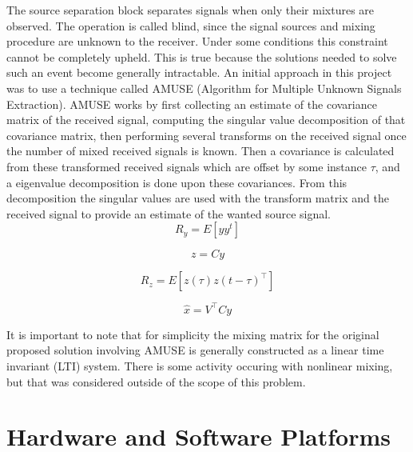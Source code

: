 The source separation block separates signals when only their mixtures are observed.  The operation is called blind, since the signal sources and mixing procedure are unknown to the receiver.  Under some conditions this constraint cannot be completely upheld.  This is true because the solutions needed to solve such an event become generally intractable.  An initial approach in this project was to use a technique called AMUSE (Algorithm for Multiple Unknown Signals Extraction)\cite{AMUSE}.  AMUSE works by first collecting an estimate of the covariance matrix of the received signal, computing the singular value decomposition of that covariance matrix, then performing several transforms on the received signal once the number of mixed received signals is known.  Then a covariance is calculated from these transformed received signals which are offset by some instance \(\tau\), and a eigenvalue decomposition is done upon these covariances.  From this decomposition the singular values are used with the transform matrix and the received signal to provide an estimate of the wanted source signal.\\

\begin{equation}\label{}
R_{y}=E[yy^{t}]
\end{equation}

\begin{equation}\label{}
z=Cy
\end{equation}

\begin{equation}\label{}
R_{z}=E[z(\tau)z(t-\tau)^\top]
\end{equation}

\begin{equation}\label{}
\hat{x}=V^\top Cy
\end{equation}

It is important to note that for simplicity the mixing matrix for the original proposed solution involving AMUSE is generally constructed as a linear time invariant (LTI) system.  There is some activity occuring with nonlinear mixing, but that was considered outside of the scope of this problem.\\

\section{Hardware and Software Platforms}

